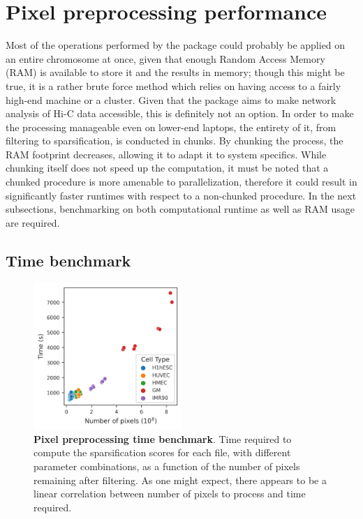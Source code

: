 

\section{Pixel preprocessing performance}
Most of the operations performed by the package could probably be applied on an entire chromosome at once, given that enough Random Access Memory (RAM) is available to store it and the results in memory; though this might be true, it is a rather brute force method which relies on having access to a fairly high-end machine or a cluster. Given that the package aims to make network analysis of Hi-C data accessible, this is definitely not an option. In order to make the processing manageable even on lower-end laptops, the entirety of it, from filtering to sparsification, is conducted in chunks. By chunking the process, the RAM footprint decreases, allowing it to adapt it to system specifics. While chunking itself does not speed up the computation, it must be noted that a chunked procedure is more amenable to parallelization, therefore it could result in significantly faster runtimes with respect to a non-chunked procedure. 
In the next subsections, benchmarking on both computational runtime as well as RAM usage are required.

\subsection{Time benchmark}

\begin{figure}[ht]
  \centering
  \includegraphics[width=0.5\textwidth]{time_benchmark.png}
  \caption{\textbf{Pixel preprocessing time benchmark}. Time required to compute the sparsification scores for each file, with different parameter combinations, as a function of the number of pixels remaining after filtering. As one might expect, there appears to be a linear correlation between number of pixels to process and time required.}
  \label{fig:timebenchmark}
\end{figure}

